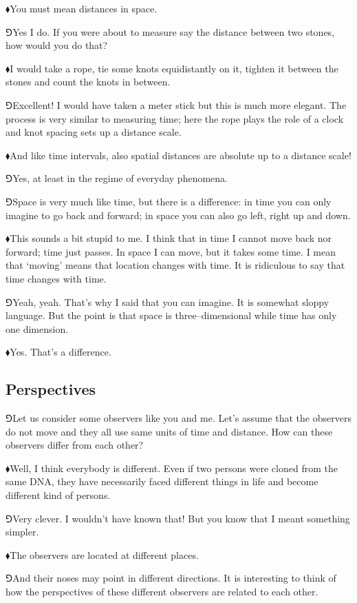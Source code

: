 \documentclass[10pt,oneside%
]{memoir}
\newcommand{\hea}{\(\blacklozenge\)\;}
\newcommand{\heb}{\(\Game\)\;}
\begin{document}
\hea You must mean distances in space.

\heb Yes I do. If you were about to measure say the distance between two stones, how would you do that?

\hea I would take a rope, tie some knots equidistantly on it, tighten it between the stones and count the knots in between.

\heb Excellent! I would have taken a meter stick but this is much more elegant. The process is very similar to measuring time; here the rope plays the role of a clock and knot spacing sets up a distance scale.

\hea And like time intervals, also spatial distances are absolute up to a distance scale!

\heb Yes, at least in the regime of everyday phenomena.

\heb Space is very much like time, but there is a difference: in time you can only imagine to go back and forward; in space you can also go left, right up and down.

\hea This sounds a bit stupid to me. I think that in time I cannot move back nor forward; time just passes. In space I can move, but it takes some time. I mean that `moving' means that location changes with time. It is ridiculous to say that time changes with time.

\heb Yeah, yeah. That's why I said that you can imagine. It is somewhat sloppy language. But the point is that space is three--dimensional while time has only one dimension.

\hea Yes. That's a difference.
\subsection{Perspectives}
\heb Let us consider some observers like you and me. Let's assume that the observers do not move and they all use same units of time and distance. How can these observers differ from each other?

\hea Well, I think everybody is different. Even if two persons were cloned from the same DNA, they have necessarily faced different things in life and become different kind of persons.

\heb Very clever. I wouldn't have known that! But you know that I meant something simpler.

\hea The observers are located at different places.

\heb And their noses may point in different directions. It is interesting to think of how the perspectives of these different observers are related to each other.
\end{document}
